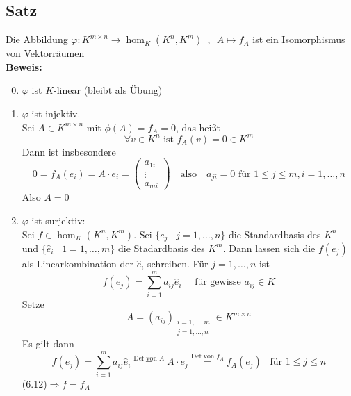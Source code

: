 \subsection{Satz} %
\label{sub:satz}
Die Abbildung $\varphi : K^{m \times n} \to \hom_K (K^n, K^m) \enspace , \enspace A \mapsto f_A$ ist ein Isomorphismus von Vektorräumen
\vspace{\baselineskip} \\
\underline{\textbf{Beweis:}} \\
\begin{enumerate}[1)]
	\setcounter{enumi}{-1}
	\item $\varphi$ ist \(K\)-linear (bleibt als Übung)
	\item $\varphi$ ist injektiv. \\
	Sei $A \in K^{m \times n}$ mit $\phi(A)=f_A=0$, das heißt
	\[
		\forall v \in K^n \text{ ist } f_A(v)=0 \in K^m
	\]
	Dann ist insbesondere
	\[
		0= f_A(e_i)= A \cdot e_i = 
		\begin{pmatrix}
			a_{1i} \\
			\vdots \\
			a_{mi}
		\end{pmatrix}
		\quad \text{also} \quad a_{ji}=0 \text{ für } 1 \le j \le m, i=1, \ldots ,n
	\]
	Also $A=0$
	\item $\varphi$ ist surjektiv: \\
	Sei $f \in \hom_K (K^n, K^m)$. Sei $\{ e_j \mid j=1, \ldots , n \}$ die Standardbasis des $K^n$ und 
	$\{ \hat e_i \mid 1= 1, \ldots, m\}$ die Stadardbasis des $K^m$. Dann lassen sich die $f(e_j)$ als Linearkombination der $\hat e_i$ schreiben.
	Für $j=1, \ldots , n$ ist
	\[
		f(e_j)= \sum\limits_{i=1}^{m} a_{ij} \hat e_i \quad \text{ für gewisse } a_{ij} \in K
	\]
	Setze
	\[
		A= (a_{ij})_{\substack{i=1, \ldots , m \\ j=1, \ldots , n}} \in K^{m \times n}
	\]
	Es gilt dann 
	\[
		f(e_j) = \sum\limits_{i=1}^{m} a_{ij} \hat e_i \overset{\text{Def von }A}{=} A \cdot e_j 
		\overset{\text{Def von }f_A}{=} f_A (e_j) \enspace \text{ für } 1 \le j \le n
	\]
	(6.12)$\Rightarrow  f=f_A$
\end{enumerate}

